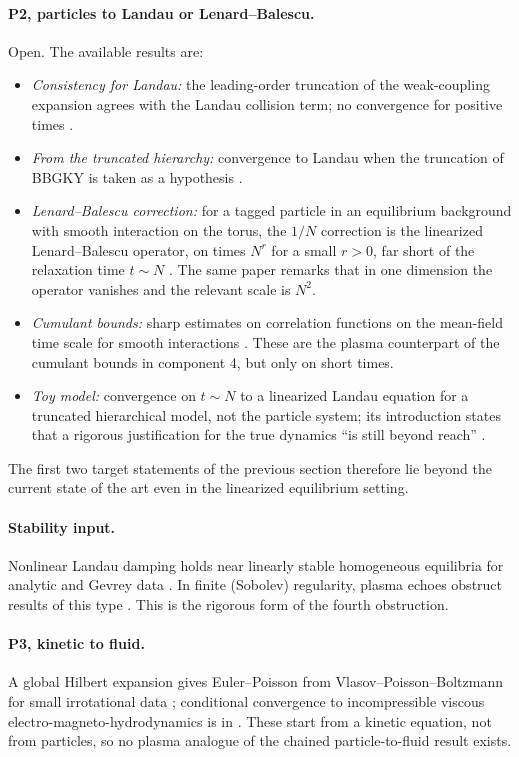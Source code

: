 \documentclass[11pt]{article}
\theoremstyle{definition}
\begin{document}
\paragraph{P2, particles to Landau or Lenard--Balescu.} Open. The available
results are:
\begin{itemize}
  \item \emph{Consistency for Landau:} the leading-order truncation of the
    weak-coupling expansion agrees with the Landau collision term; no
    convergence for positive times \cite{BPS}.
  \item \emph{From the truncated hierarchy:} convergence to Landau when the
    truncation of BBGKY is taken as a hypothesis \cite{VelazquezWinter,Winter}.
  \item \emph{Lenard--Balescu correction:} for a tagged particle in an
    equilibrium background with smooth interaction on the torus, the $1/N$
    correction is the linearized Lenard--Balescu operator, on times $N^r$ for
    a small $r > 0$, far short of the relaxation time $t\sim N$
    \cite{DuerinckxSR}. The same paper remarks that in one dimension the
    operator vanishes and the relevant scale is $N^2$.
  \item \emph{Cumulant bounds:} sharp estimates on correlation functions on
    the mean-field time scale for smooth interactions \cite{DuerinckxChaos}.
    These are the plasma counterpart of the cumulant bounds in component 4,
    but only on short times.
  \item \emph{Toy model:} convergence on $t\sim N$ to a linearized Landau
    equation for a truncated hierarchical model, not the particle system;
    its introduction states that a rigorous justification for the true
    dynamics ``is still beyond reach'' \cite{DuerinckxLeBihan}.
\end{itemize}
The first two target statements of the previous section therefore lie beyond
the current state of the art even in the linearized equilibrium setting.

\paragraph{Stability input.} Nonlinear Landau damping holds near linearly
stable homogeneous equilibria for analytic and Gevrey data
\cite{MouhotVillani,BMM}. In finite (Sobolev) regularity, plasma echoes
obstruct results of this type \cite{BedrossianEcho}. This is the rigorous
form of the fourth obstruction.

\paragraph{P3, kinetic to fluid.} A global Hilbert expansion gives
Euler--Poisson from Vlasov--Poisson--Boltzmann for small irrotational data
\cite{GuoJang}; conditional convergence to incompressible viscous
electro-magneto-hydrodynamics is in \cite{ArsenioSR}. These start from a
kinetic equation, not from particles, so no plasma analogue of the chained
particle-to-fluid result \cite{DHM2} exists.
\end{document}
